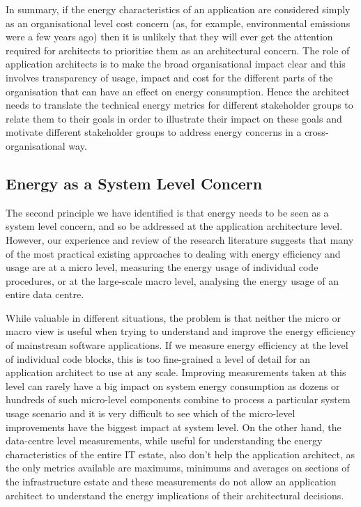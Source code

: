 In summary, if the energy characteristics of an application are considered simply as an organisational level cost concern (as, for example, environmental emissions were a few years ago) then it is unlikely that they will ever get the attention required for architects to prioritise them as an architectural concern.  The role of application architects is to make the broad organisational impact clear and this involves transparency of usage, impact and cost for the different parts of the organisation that can have an effect on energy consumption.  Hence the architect needs to translate the technical energy metrics for different stakeholder groups to relate them to their goals in order to illustrate their impact on these goals and motivate different stakeholder groups to address energy concerns in a cross-organisational way. 

\subsection{Energy as a System Level Concern}

The second principle we have identified is that energy needs to be seen as a system level concern, and so be addressed at the application architecture level.  However, our experience and review of the research literature suggests that many of the most practical existing approaches to dealing with energy efficiency and usage are at a micro level, measuring the energy usage of individual code procedures, or at the large-scale macro level, analysing the energy usage of an entire data centre.  

While valuable in different situations, the problem is that neither the micro or macro view is useful when trying to understand and improve the energy efficiency of mainstream software applications.  If we measure energy efficiency at the level of individual code blocks, this is too fine-grained a level of detail for an application architect to use at any scale.  Improving measurements taken at this level can rarely have a big impact on system energy consumption as dozens or hundreds of such micro-level components combine to process a particular system usage scenario and it is very difficult to see which of the micro-level improvements have the biggest impact at system level.  On the other hand, the data-centre level measurements, while useful for understanding the energy characteristics of the entire IT estate, also don't help the application architect, as the only metrics available are maximums, minimums and averages on sections of the infrastructure estate and these measurements do not allow an application architect to understand the energy implications of their architectural decisions.

